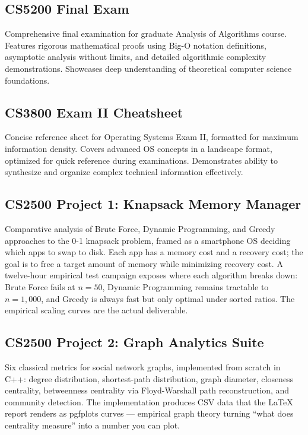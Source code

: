 \documentclass{mst}
\begin{document}
\subsection*{CS5200 Final Exam}
Comprehensive final examination for graduate Analysis of Algorithms course. Features rigorous mathematical proofs using Big-O notation definitions, asymptotic analysis without limits, and detailed algorithmic complexity demonstrations. Showcases deep understanding of theoretical computer science foundations.

\subsection*{CS3800 Exam II Cheatsheet}
Concise reference sheet for Operating Systems Exam II, formatted for maximum information density. Covers advanced OS concepts in a landscape format, optimized for quick reference during examinations. Demonstrates ability to synthesize and organize complex technical information effectively.

\subsection*{CS2500 Project 1: Knapsack Memory Manager}
Comparative analysis of Brute Force, Dynamic Programming, and Greedy approaches to the 0-1 knapsack problem, framed as a smartphone OS deciding which apps to swap to disk. Each app has a memory cost and a recovery cost; the goal is to free a target amount of memory while minimizing recovery cost. A twelve-hour empirical test campaign exposes where each algorithm breaks down: Brute Force fails at $n=50$, Dynamic Programming remains tractable to $n=1{,}000$, and Greedy is always fast but only optimal under sorted ratios. The empirical scaling curves are the actual deliverable.

\subsection*{CS2500 Project 2: Graph Analytics Suite}
Six classical metrics for social network graphs, implemented from scratch in C++: degree distribution, shortest-path distribution, graph diameter, closeness centrality, betweenness centrality via Floyd-Warshall path reconstruction, and community detection. The implementation produces CSV data that the LaTeX report renders as pgfplots curves --- empirical graph theory turning ``what does centrality measure'' into a number you can plot.
\end{document}
